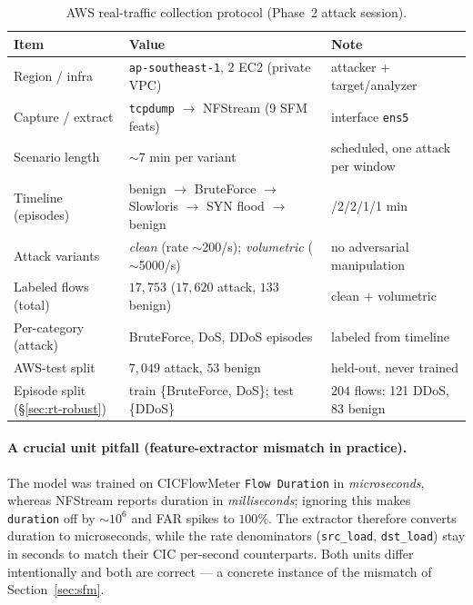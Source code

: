 \documentclass[preprint,12pt,authoryear]{elsarticle}
\begin{document}
\begin{table}[htbp]
\centering
\caption{AWS real-traffic collection protocol (Phase~2 attack session).}
\label{tab:aws-protocol}
\footnotesize
\begin{tabular}{@{}>{\raggedright\arraybackslash}p{}>{\raggedright\arraybackslash}p{}>{\raggedright\arraybackslash}p{}@{}}
\toprule
Item & Value & Note \\
\midrule
Region / infra & \texttt{ap-southeast-1}, 2 EC2 (private VPC) & attacker + target/analyzer \\
Capture / extract & \texttt{tcpdump} $\to$ NFStream (9 SFM feats) & interface \texttt{ens5} \\
Scenario length & $\sim$7 min per variant & scheduled, one attack per window \\
Timeline (episodes) & benign $\to$ BruteForce $\to$ Slowloris $\to$ SYN flood $\to$ benign & 1/2/2/1/1 min \\
Attack variants & \emph{clean} (rate $\sim$200/s); \emph{volumetric} ($\sim$5000/s) & no adversarial manipulation \\
Labeled flows (total) & $17{,}753$ ($17{,}620$ attack, $133$ benign) & clean $+$ volumetric \\
Per-category (attack) & BruteForce, DoS, DDoS episodes & labeled from timeline \\
AWS-test split & $7{,}049$ attack, $53$ benign & held-out, never trained \\
Episode split (§\ref{sec:rt-robust}) & train \{BruteForce, DoS\}; test \{DDoS\} & $204$ flows: 121 DDoS, 83 benign \\
\bottomrule
\end{tabular}
\end{table}

\paragraph{A crucial unit pitfall (feature-extractor mismatch in practice).} The
model was trained on CICFlowMeter \texttt{Flow Duration} in \emph{microseconds},
whereas NFStream reports duration in \emph{milliseconds}; ignoring this makes
\texttt{duration} off by $\sim$$10^6$ and FAR spikes to $100\%$. The extractor
therefore converts duration to microseconds, while the rate denominators
(\texttt{src\_load}, \texttt{dst\_load}) stay in seconds to match their CIC
per-second counterparts. Both units differ intentionally and both are correct --- a
concrete instance of the mismatch of Section~\ref{sec:sfm}.
\end{document}
